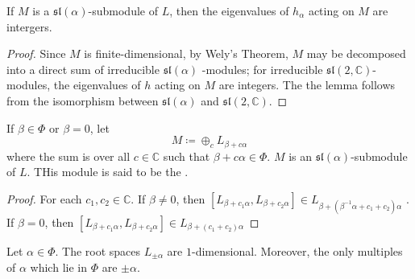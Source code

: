 \documentclass[../main.tex]{subfiles}
\begin{document}
\begin{lemma}{}{}
    If \(  M  \) is a \(  \mathfrak{sl}\left( \alpha  \right)   \)-submodule of \(  L  \), then the eigenvalues of \(  h_{\alpha }  \) acting on \(  M  \) are intergers.     
\end{lemma}

\begin{proof}
    Since \(  M  \) is finite-dimensional, by Wely's Theorem, \(  M  \) may be decomposed into a direct sum of irreducible \(  \mathfrak{sl}\left( \alpha  \right)   \)  -modules; for irreducible \(  \mathfrak{sl}\left( 2,\mathbb{C}  \right)   \)-modules, the eigenvalues of \(  h  \) acting on \(  M  \) are integers. The the lemma follows from the isomorphism between \(  \mathfrak{sl}\left( \alpha  \right)   \) and \(  \mathfrak{sl}\left( 2,\mathbb{C}  \right)   \).     
\end{proof}

\begin{definition}{}{}
    If \(  \beta \in \Phi   \) or \(  \beta = 0  \), let \[
    M\coloneqq \oplus _{c}L_{\beta + c\alpha }
    \]where the sum is over all \(  c \in \mathbb{C}   \) such that \(  \beta + c\alpha \in \Phi   \).  \(  M  \) is an \(  \mathfrak{sl}\left( \alpha  \right)   \)-submodule of \(  L  \). THis module is said to be the .       
\end{definition}
\begin{proof}
    For each \(  c_1,c_2\in \mathbb{C}   \). If \(  \beta \neq 0  \), then  \(  \left[ L_{\beta + c_1\alpha },L_{\beta + c_2\alpha } \right]\in L_{\beta + \left( \beta ^{-1} \alpha + c_1+ c_2 \right)\alpha  }   \) . If \(  \beta = 0  \), then \(  \left[ L_{\beta + c_1\alpha },L_{\beta + c_2\alpha } \right]\in L_{\beta + \left( c_1+ c_2 \right)\alpha  }   \)   
\end{proof}
\begin{proposition}{}{}
    Let \(  \alpha \in \Phi   \). The root spaces \(  L_{\pm \alpha }  \) are \(  1  \)-dimensional. Moreover, the only multiples of \(  \alpha   \) which lie in \(  \Phi   \) are \(  \pm \alpha   \).      
\end{proposition}
\end{document}
